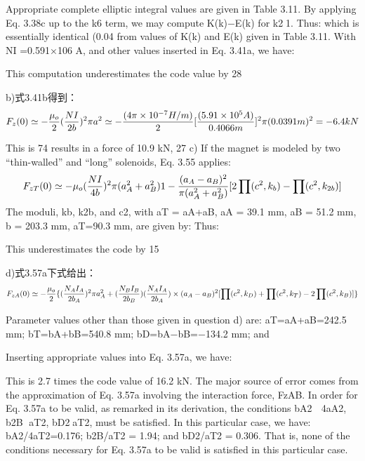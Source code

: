 Appropriate complete elliptic integral values are given in Table 3.11. By applying
Eq. 3.38c up to the k6 term, we may compute K(k)−E(k) for k21. Thus:
which is essentially identical (0.04%
from values of K(k) and E(k) given in Table 3.11.
With NI =0.591×106 A, and other values inserted in Eq. 3.41a, we have:

This computation underestimates the code value by 28%

b)式3.41b得到：
$$
F_{z}(0)\simeq-\frac{\mu_{o}}{2}(\frac{NI}{2b})^{2}\pi a^{2}\\%
\simeq-\frac{(4\pi\times10^{-7}H/m)}{2}[\frac{(5.91\times10^{5}A)}{0.4066m}]^{2}\pi(0.0391m)^{2}\\
=-6.4kN\\
$$

This is 74%
results in a force of 10.9 kN, 27%
c) If the magnet is modeled by two “thin-walled” and “long” solenoids, Eq. 3.55
applies:
$$
F_{zT}(0)\simeq-\mu_{o}(\frac{NI}{4b})^{2}\pi(a_{A}^{2}+a_{B}^{2}){1-\frac{(a_{A}-a_{B})^{2}}{\pi(a_{A}^{2}+a_{B}^{2})}[2\prod(c^{2},k_{b})-\prod(c^{2},k_{2b})]}\\%
$$
The moduli, kb, k2b, and c2, with aT = aA+aB, aA = 39.1 mm, aB = 51.2 mm, b =
203.3 mm, aT=90.3 mm, are given by:
Thus:

This underestimates the code by 15%


d)式3.57a下式给出：
$$
F_{zA}(0)\simeq-\frac{\mu_{o}}{2}\{(\frac{N_{A}I_{A}}{2b_{A}})^{2}\pi a_{A}^{2}+(\frac{N_{B}I_{B}}{2b_{B}})(\frac{N_{A}I_{A}}{2b_{A}})\times\\
(a_{A}-a_{B})^{2}[\prod(c^{2},k_{D})+\prod(c^{2},k_{T})-2\prod(c^{2},k_{B})]\}\\%
$$

Parameter values other than those given in question d) are: aT=aA+aB=242.5 mm;
bT=bA+bB=540.8 mm; bD=bA−bB=−134.2 mm; and

Inserting appropriate values into Eq. 3.57a, we have:

This is 2.7 times the code value of 16.2 kN. The major source of error comes from
the approximation of Eq. 3.57a involving the interaction force, FzAB. In order
for Eq. 3.57a to be valid, as remarked in its derivation, the conditions bA2  4aA2,
b2B aT2, bD2aT2, must be satisfied. In this particular case, we have: bA2/4aT2=0.176;
b2B/aT2 = 1.94; and bD2/aT2 = 0.306. That is, none of the conditions necessary for
Eq. 3.57a to be valid is satisfied in this particular case.


